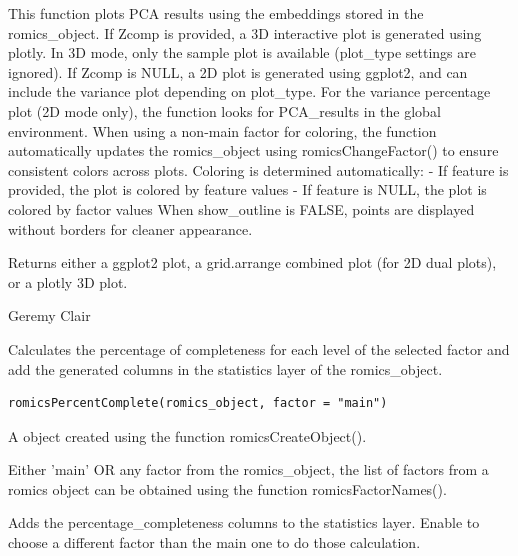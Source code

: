 \documentclass[a4paper]{book}
\begin{document}
%
\begin{Details}
This function plots PCA results using the embeddings stored in the romics\_object.
If Zcomp is provided, a 3D interactive plot is generated using plotly. In 3D mode, only the sample plot
is available (plot\_type settings are ignored).
If Zcomp is NULL, a 2D plot is generated using ggplot2, and can include the variance plot depending on plot\_type.
For the variance percentage plot (2D mode only), the function looks for PCA\_results in the global environment.
When using a non-main factor for coloring, the function automatically updates the romics\_object
using romicsChangeFactor() to ensure consistent colors across plots.
Coloring is determined automatically:
- If feature is provided, the plot is colored by feature values
- If feature is NULL, the plot is colored by factor values
When show\_outline is FALSE, points are displayed without borders for cleaner appearance.
\end{Details}
%
\begin{Value}
Returns either a ggplot2 plot, a grid.arrange combined plot (for 2D dual plots), or a plotly 3D plot.
\end{Value}
%
\begin{Author}
Geremy Clair
\end{Author}
%
\begin{Description}
Calculates the percentage of completeness for each level of the selected factor and add the generated columns in the statistics layer of the romics\_object.
\end{Description}
%
\begin{Usage}
\begin{verbatim}
romicsPercentComplete(romics_object, factor = "main")
\end{verbatim}
\end{Usage}
%
\begin{Arguments}
\begin{ldescription}
\item[\code{romics\_object}] A object created using the function romicsCreateObject().

\item[\code{main\_factor}] Either 'main' OR any factor from the romics\_object, the list of factors from a romics object can be obtained using the function romicsFactorNames().
\end{ldescription}
\end{Arguments}
%
\begin{Details}
Adds the percentage\_completeness columns to the statistics layer. Enable to choose a different factor than the main one to do those calculation.
\end{Details}
\end{document}
